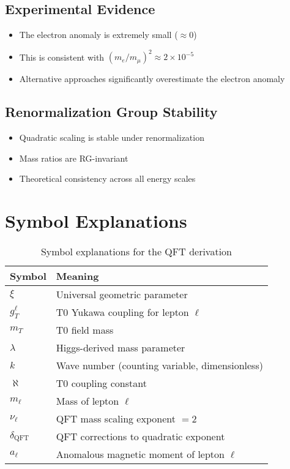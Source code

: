 \documentclass[12pt,a4paper]{article}
\begin{document}
	\subsection{Experimental Evidence}
	\begin{itemize}
		\item The electron anomaly is extremely small ($\approx 0$)
		\item This is consistent with $(m_e/m_\mu)^2 \approx 2 \times 10^{-5}$
		\item Alternative approaches significantly overestimate the electron anomaly
	\end{itemize}
	
	\subsection{Renormalization Group Stability}
	\begin{itemize}
		\item Quadratic scaling is stable under renormalization
		\item Mass ratios are RG-invariant
		\item Theoretical consistency across all energy scales
	\end{itemize}
	
	\section{Symbol Explanations}
	
	\begin{table}[h]
		\centering
		\begin{tabular}{ll}
			\toprule
			\textbf{Symbol} & \textbf{Meaning} \\
			\midrule
			$\xi$ & Universal geometric parameter \\
			$g_T^\ell$ & T0 Yukawa coupling for lepton $\ell$ \\
			$m_T$ & T0 field mass \\
			$\lambda$ & Higgs-derived mass parameter \\
			$k$ & Wave number (counting variable, dimensionless) \\
			$\aleph$ & T0 coupling constant \\
			$m_\ell$ & Mass of lepton $\ell$ \\
			$\nu_\ell$ & QFT mass scaling exponent $= 2$ \\
			$\delta_{\text{QFT}}$ & QFT corrections to quadratic exponent \\
			$a_\ell$ & Anomalous magnetic moment of lepton $\ell$ \\
			\bottomrule
		\end{tabular}
		\caption{Symbol explanations for the QFT derivation}
	\end{table}
	
\end{document}
